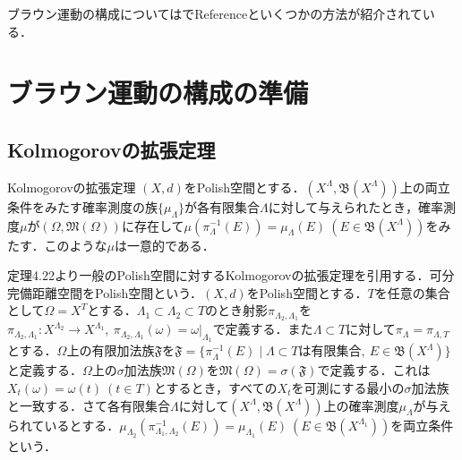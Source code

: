 \documentclass[dvipdfmx]{jsarticle}
\title{\empty}
\author{\empty}
\date{\today}
\begin{document}
%
%
%
%
ブラウン運動の構成については\cite{rekkyo}でReferenceといくつかの方法が紹介されている．
%
%
%
%
\section{ブラウン運動の構成の準備}
\subsection{Kolmogorovの拡張定理}
\begin{itembox}[l]{Kolmogorovの拡張定理}
$(X,d)$をPolish空間とする．$(X^\Lambda,\mathfrak{B}(X^\Lambda))$上の両立条件をみたす確率測度の族$\{\mu_\Lambda\}$が各有限集合$\Lambda$に対して与えられたとき，確率測度$\mu$が$(\Omega,\mathfrak{M}(\Omega))$に存在して$\mu(\pi_\Lambda^{-1}(E))=\mu_\Lambda(E){\ }(E\in\mathfrak{B}(X^\Lambda))$をみたす．このような$\mu$は一意的である．
\end{itembox}
\cite{kotani}定理4.22より一般のPolish空間に対するKolmogorovの拡張定理を引用する．可分完備距離空間をPolish空間という．$(X,d)$をPolish空間とする．$T$を任意の集合として$\Omega=X^T$とする．$\Lambda_1\subset \Lambda_2\subset T$のとき射影$\pi_{\Lambda_2,\Lambda_1}$を$\pi_{\Lambda_2,\Lambda_1}:X^{\Lambda_2}\to X^{\Lambda_1},{\ }\pi_{\Lambda_2,\Lambda_1}(\omega)=\omega |_{\Lambda_1}$で定義する．また$\Lambda\subset T$に対して$\pi_\Lambda=\pi_{\Lambda,T}$とする．$\Omega$上の有限加法族$\mathfrak{F}$を$\mathfrak{F}=\{\pi_\Lambda^{-1}(E)\mid \Lambda\subset Tは有限集合,{\ }E\in\mathfrak{B}(X^\Lambda)\}$と定義する．$\Omega$上の$\sigma$加法族$\mathfrak{M}(\Omega)$を$\mathfrak{M}(\Omega)=\sigma(\mathfrak{F})$で定義する．これは$X_t(\omega)=\omega(t){\ }(t\in T)$とするとき，すべての$X_t$を可測にする最小の$\sigma$加法族と一致する．さて各有限集合$\Lambda$に対して$(X^\Lambda,\mathfrak{B}(X^\Lambda))$上の確率測度$\mu_\Lambda$が与えられているとする．$\mu_{\Lambda_2}(\pi^{-1}_{\Lambda_1,\Lambda_2}(E))=\mu_{\Lambda_1}(E){\ }(E\in\mathfrak{B}(X^{\Lambda_1}))$を両立条件という．
%
%
%
%
\end{document}
